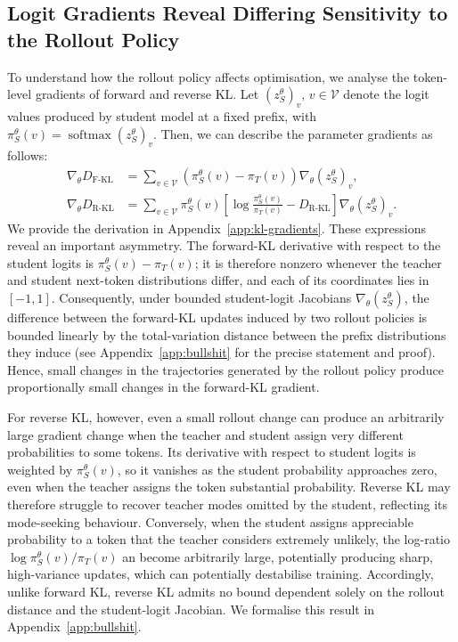 \documentclass{article} %
\theoremstyle{plain}
\theoremstyle{definition}
\theoremstyle{remark}
\begin{document}
\subsection{Logit Gradients Reveal Differing Sensitivity to the Rollout Policy}
To understand how the rollout policy affects optimisation, we analyse the token-level gradients of forward and reverse KL. Let $(z_S^\theta)_v, \, v \in \mathcal{V}$ denote the logit values produced by student model at a fixed prefix, with $\pi_S^\theta(v) = \operatorname{softmax}(z_S^\theta)_v$. Then, we can describe the parameter gradients as follows:
\begin{align}
    \nabla_\theta D_{\text{F-KL}} &= \sum_{v \in \mathcal{V}} (\pi_S^\theta(v) - \pi_T(v))\nabla_\theta (z_S^\theta)_v, \label{eq:gradient_forward_kl} \\
    \nabla_\theta D_{\text{R-KL}} &= \sum_{v \in \mathcal{V}} \pi_S^\theta(v)\left[\log\frac{\pi_S^\theta(v)}{\pi_T(v)} - D_{\text{R-KL}}\right] \nabla_\theta (z_S^\theta)_v. \label{eq:gradient_reverse_kl}
\end{align}
We provide the derivation in Appendix~\ref{app:kl-gradients}. These expressions reveal an important asymmetry. The forward-KL derivative with respect to the student logits is
$\pi_S^\theta(v)-\pi_T(v)$; it is therefore nonzero
whenever the teacher and student next-token distributions differ, and each of its coordinates lies in $[-1,1]$. Consequently, under bounded student-logit Jacobians $\nabla_\theta(z_S^\theta)$, the difference between the forward-KL updates induced by two rollout policies is bounded linearly by the total-variation distance between the prefix distributions they induce (see Appendix~\ref{app:bullshit} for the precise statement and proof). Hence, small changes in the trajectories generated by the rollout policy produce proportionally small changes in the forward-KL gradient.

For reverse KL, however, even a small rollout change can produce an arbitrarily large gradient change when the teacher and student assign very different probabilities to some tokens. Its derivative with respect to student logits is weighted by $\pi_S^\theta(v)$, so it vanishes as the student probability approaches zero, even when the teacher assigns the token substantial probability. Reverse KL may therefore struggle to recover teacher modes omitted by the student, reflecting its mode-seeking behaviour. Conversely, when the student assigns appreciable probability to a token that the teacher considers extremely unlikely, the log-ratio $\log{\pi_S^\theta(v)/\pi_T(v)}$ an become arbitrarily
large, potentially producing sharp, high-variance updates, which can potentially destabilise training. Accordingly, unlike forward KL, reverse KL admits no bound dependent solely on the rollout distance and the student-logit Jacobian. We formalise this result in Appendix~\ref{app:bullshit}.
\end{document}
